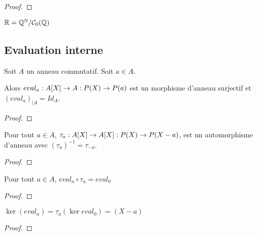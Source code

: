 \ifdefined\outputproof
\begin{proof}

\end{proof}
\fi

\begin{definition}
	$\mathbb{R} = \mathbb{Q}^{\mathbb{N}} / \mathcal{C}_{0}(\mathbb{Q})$
\end{definition}

\subsection{Evaluation interne}

\begin{proposition}
	Soit $A$ un anneau commutatif. Soit $a \in A$.

	Alors $eval_{a} : A[X] \rightarrow A : P(X) \rightarrow P(a)$ est un
	morphisme d'anneau surjectif et ${(eval_{a})}_{|A} = Id_{A}$.
\end{proposition}

\ifdefined\outputproof
\begin{proof}

\end{proof}
\fi

\begin{proposition}
	Pour tout $a \in A$, $\tau_{a} : A[X] \rightarrow A[X] : P(X) \rightarrow
	P(X - a)$, est un automorphisme d'anneau avec $(\tau_{a})^{-1} =
	\tau_{-a}$.
\end{proposition}

\ifdefined\outputproof
\begin{proof}

\end{proof}
\fi

\begin{proposition}
	Pour tout $a \in A$, $eval_{a} \circ \tau_{a} = eval_{0}$
\end{proposition}

\ifdefined\outputproof
\begin{proof}

\end{proof}
\fi

\begin{corollary}
	$\ker(eval_{a}) = \tau_{a}(\ker{eval_{0}}) = (X - a)$
\end{corollary}

\ifdefined\outputproof
\begin{proof}

\end{proof}
\fi

